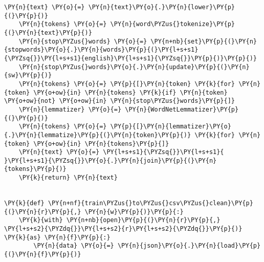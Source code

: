 \documentclass[../main.tex]{subfiles}
\begin{document}
\begin{tcolorbox}[breakable, size=fbox, boxrule=1pt, pad at break*=1mm,colback=cellbackground, colframe=cellborder]
\begin{Verbatim}[commandchars=\\\{\}]
    \PY{n}{text} \PY{o}{=} \PY{n}{text}\PY{o}{.}\PY{n}{lower}\PY{p}{(}\PY{p}{)}
    \PY{n}{tokens} \PY{o}{=} \PY{n}{word\PYZus{}tokenize}\PY{p}{(}\PY{n}{text}\PY{p}{)}
    \PY{n}{stop\PYZus{}words} \PY{o}{=} \PY{n+nb}{set}\PY{p}{(}\PY{n}{stopwords}\PY{o}{.}\PY{n}{words}\PY{p}{(}\PY{l+s+s1}{\PYZsq{}}\PY{l+s+s1}{english}\PY{l+s+s1}{\PYZsq{}}\PY{p}{)}\PY{p}{)}
    \PY{n}{stop\PYZus{}words}\PY{o}{.}\PY{n}{update}\PY{p}{(}\PY{n}{sw}\PY{p}{)}
    \PY{n}{tokens} \PY{o}{=} \PY{p}{[}\PY{n}{token} \PY{k}{for} \PY{n}{token} \PY{o+ow}{in} \PY{n}{tokens} \PY{k}{if} \PY{n}{token} \PY{o+ow}{not} \PY{o+ow}{in} \PY{n}{stop\PYZus{}words}\PY{p}{]}
    \PY{n}{lemmatizer} \PY{o}{=} \PY{n}{WordNetLemmatizer}\PY{p}{(}\PY{p}{)}
    \PY{n}{tokens} \PY{o}{=} \PY{p}{[}\PY{n}{lemmatizer}\PY{o}{.}\PY{n}{lemmatize}\PY{p}{(}\PY{n}{token}\PY{p}{)} \PY{k}{for} \PY{n}{token} \PY{o+ow}{in} \PY{n}{tokens}\PY{p}{]}
    \PY{n}{text} \PY{o}{=} \PY{l+s+s1}{\PYZsq{}}\PY{l+s+s1}{ }\PY{l+s+s1}{\PYZsq{}}\PY{o}{.}\PY{n}{join}\PY{p}{(}\PY{n}{tokens}\PY{p}{)}
    \PY{k}{return} \PY{n}{text}


\PY{k}{def} \PY{n+nf}{train\PYZus{}to\PYZus{}csv\PYZus{}clean}\PY{p}{(}\PY{n}{r}\PY{p}{,} \PY{n}{w}\PY{p}{)}\PY{p}{:}
    \PY{k}{with} \PY{n+nb}{open}\PY{p}{(}\PY{n}{r}\PY{p}{,} \PY{l+s+s2}{\PYZdq{}}\PY{l+s+s2}{r}\PY{l+s+s2}{\PYZdq{}}\PY{p}{)} \PY{k}{as} \PY{n}{f}\PY{p}{:}
        \PY{n}{data} \PY{o}{=} \PY{n}{json}\PY{o}{.}\PY{n}{load}\PY{p}{(}\PY{n}{f}\PY{p}{)}


\end{Verbatim}
\end{tcolorbox}
\end{document}

